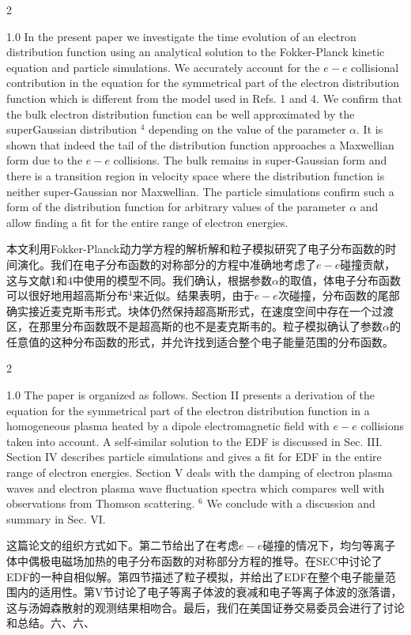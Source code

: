 \documentclass[oneside,onecolumn]{article}
\newcommand\enzhbox[2]{
	\quad\par \begin{paracol}{2} 
			\begin{spacing}{1.0}
					\footnotesize  #1
			\end{spacing}
			
		\switchcolumn[1] 
		#2
	\end{paracol} 
}
\begin{document}
\begin{sloppypar}
\enzhbox{  In the present paper we investigate the time evolution of an electron distribution function using an analytical solution to the Fokker-Planck kinetic equation and particle simulations. We accurately account for the $e-e$ collisional contribution in the equation for the symmetrical part of the electron distribution function which is different from the model used in Refs. 1 and 4. We confirm that the bulk electron distribution function can be well approximated by the superGaussian distribution ${ }^{4}$ depending on the value of the parameter $\alpha$. It is shown that indeed the tail of the distribution function approaches a Maxwellian form due to the $e-e$ collisions. The bulk remains in super-Gaussian form and there is a transition region in velocity space where the distribution function is neither super-Gaussian nor Maxwellian. The particle simulations confirm such a form of the distribution function for arbitrary values of the parameter $\alpha$ and allow finding a fit for the entire range of electron energies.
}{
本文利用Fokker-Planck动力学方程的解析解和粒子模拟研究了电子分布函数的时间演化。我们在电子分布函数的对称部分的方程中准确地考虑了$e-e$碰撞贡献，这与文献1和4中使用的模型不同。我们确认，根据参数$\alpha$的取值，体电子分布函数可以很好地用超高斯分布${ }^{4}$来近似。结果表明，由于$e-e$次碰撞，分布函数的尾部确实接近麦克斯韦形式。块体仍然保持超高斯形式，在速度空间中存在一个过渡区，在那里分布函数既不是超高斯的也不是麦克斯韦的。粒子模拟确认了参数$\alpha$的任意值的这种分布函数的形式，并允许找到适合整个电子能量范围的分布函数。
}


\enzhbox{
The paper is organized as follows. Section II presents a derivation of the equation for the symmetrical part of the electron distribution function in a homogeneous plasma heated by a dipole electromagnetic field with $e-e$ collisions taken into account. A self-similar solution to the EDF is discussed in Sec. III. Section IV describes particle simulations and gives a fit for EDF in the entire range of electron energies. Section $\mathrm{V}$ deals with the damping of electron plasma waves and electron plasma wave fluctuation spectra which compares well with observations from Thomson scattering. ${ }^{6}$ We conclude with a discussion and summary in Sec. VI.
}{
这篇论文的组织方式如下。第二节给出了在考虑$e-e$碰撞的情况下，均匀等离子体中偶极电磁场加热的电子分布函数的对称部分方程的推导。在SEC中讨论了EDF的一种自相似解。第四节描述了粒子模拟，并给出了EDF在整个电子能量范围内的适用性。第$\mathrm{V}$节讨论了电子等离子体波的衰减和电子等离子体波的涨落谱，这与汤姆森散射的观测结果相吻合。最后，我们在美国证券交易委员会进行了讨论和总结。六、六、
}
  

\end{sloppypar}
\end{document}
